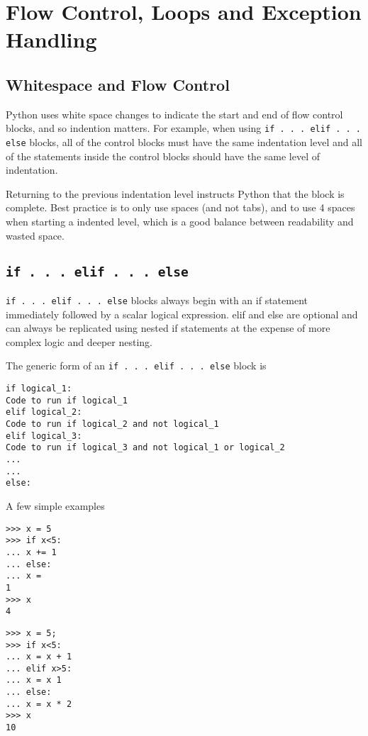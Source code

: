 \documentclass[KSmain.tex]{subfiles}
\begin{document}
 
\section{Flow Control, Loops and Exception Handling}
\subsection{Whitespace and Flow Control}
Python uses white space changes to indicate the start and end of flow control blocks, and so indention
matters. For example, when using \texttt{if . . . elif . . . else} blocks, all of the control blocks must have the same
indentation level and all of the statements inside the control blocks should have the same level of indentation.

Returning to the previous indentation level instructs Python that the block is complete. Best practice
is to only use spaces (and not tabs), and to use 4 spaces when starting a indented level, which is a good
balance between readability and wasted space.
\subsection{\texttt{if . . . elif . . . else}}
\texttt{if . . . elif . . . else} blocks always begin with an if statement immediately followed by a scalar logical
expression. elif and else are optional and can always be replicated using nested if statements at the
expense of more complex logic and deeper nesting. 

\noindent The generic form of an \texttt{if . . . elif . . . else} block is

\begin{framed}
\begin{verbatim}
if logical_1:
Code to run if logical_1
elif logical_2:
Code to run if logical_2 and not logical_1
elif logical_3:
Code to run if logical_3 and not logical_1 or logical_2
...
...
else:
\end{verbatim}
\end{framed}
%
A few simple examples
\begin{framed}
	\begin{verbatim}>>> x = 5
>>> if x<5:
... x += 1
... else:
... x =
1
>>> x
4
\end{verbatim}
\end{framed}
\begin{framed}
\begin{verbatim}
>>> x = 5;
>>> if x<5:
... x = x + 1
... elif x>5:
... x = x 1
... else:
... x = x * 2
>>> x
10
\end{verbatim}
\end{framed}
\newpage
\end{document}
